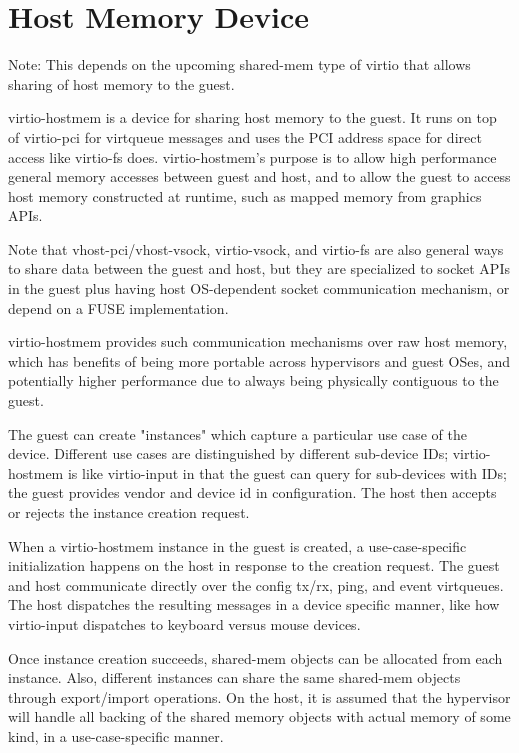 \section{Host Memory Device}\label{sec:Device Types / Host Memory Device}

Note: This depends on the upcoming shared-mem type of virtio
that allows sharing of host memory to the guest.

virtio-hostmem is a device for sharing host memory to the guest.
It runs on top of virtio-pci for virtqueue messages and
uses the PCI address space for direct access like virtio-fs does.
virtio-hostmem's purpose is
to allow high performance general memory accesses between guest and host,
and to allow the guest to access host memory constructed at runtime,
such as mapped memory from graphics APIs.

Note that vhost-pci/vhost-vsock, virtio-vsock, and virtio-fs
are also general ways to share data between the guest and host,
but they are specialized to socket APIs in the guest plus
having host OS-dependent socket communication mechanism,
or depend on a FUSE implementation.

virtio-hostmem provides such communication mechanisms over raw host memory,
which has benefits of being more portable across hypervisors and guest OSes,
and potentially higher performance due to always being physically contiguous to the guest.

The guest can create "instances" which capture
a particular use case of the device.
Different use cases are distinguished by different sub-device IDs;
virtio-hostmem is like virtio-input in that the guest can query
for sub-devices with IDs;
the guest provides vendor and device id in configuration.
The host then accepts or rejects the instance creation request.

When a virtio-hostmem instance in the guest is created,
a use-case-specific initialization happens on the host
in response to the creation request.
The guest and host communicate directly
over the config tx/rx, ping, and event virtqueues.
The host dispatches the resulting messages in a device specific manner,
like how virtio-input dispatches to keyboard versus mouse devices.

Once instance creation succeeds,
shared-mem objects can be allocated from each instance.
Also, different instances can share the same shared-mem objects
through export/import operations.
On the host, it is assumed that the hypervisor will handle
all backing of the shared memory objects with actual memory of some kind,
in a use-case-specific manner.


